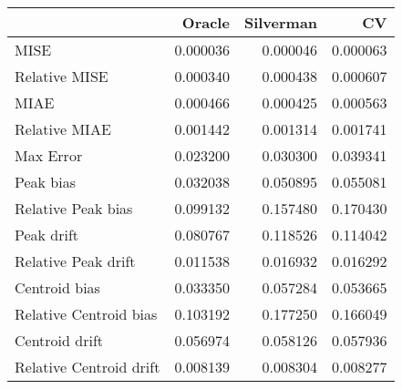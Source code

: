 \begin{tabular}{lrrr}
  \hline
 & Oracle & Silverman & CV \\ 
  \hline
MISE & 0.000036 & 0.000046 & 0.000063 \\ 
  Relative MISE & 0.000340 & 0.000438 & 0.000607 \\ 
  MIAE & 0.000466 & 0.000425 & 0.000563 \\ 
  Relative MIAE & 0.001442 & 0.001314 & 0.001741 \\ 
  Max Error & 0.023200 & 0.030300 & 0.039341 \\ 
  Peak bias & 0.032038 & 0.050895 & 0.055081 \\ 
  Relative Peak bias & 0.099132 & 0.157480 & 0.170430 \\ 
  Peak drift & 0.080767 & 0.118526 & 0.114042 \\ 
  Relative Peak drift & 0.011538 & 0.016932 & 0.016292 \\ 
  Centroid bias & 0.033350 & 0.057284 & 0.053665 \\ 
  Relative Centroid bias & 0.103192 & 0.177250 & 0.166049 \\ 
  Centroid drift & 0.056974 & 0.058126 & 0.057936 \\ 
  Relative Centroid drift & 0.008139 & 0.008304 & 0.008277 \\ 
   \hline
\end{tabular}
